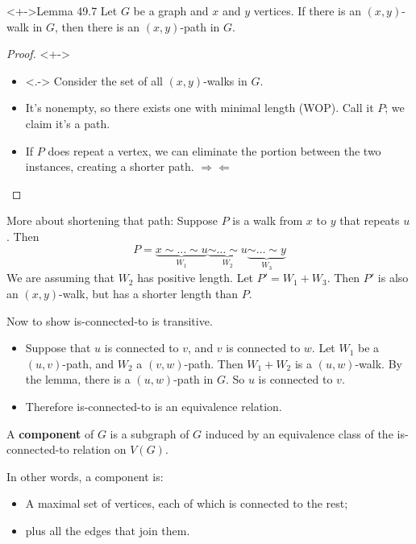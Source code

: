 \documentclass[ignorenonframetext,aspectratio=169]{beamer}
\let\defined\textbf
\newcommand{\raa}{$\Rightarrow\Leftarrow$}
\begin{document}
\begin{frame}[label=lemma]
\begin{block}<+->{Lemma 49.7}
Let $G$ be a graph and $x$ and $y$ vertices.
If there is an $(x,y)$-walk in $G$, then there is an $(x,y)$-path in $G$.
\end{block}
\begin{proof}<+->
\begin{itemize}
\item<.-> Consider the set of all $(x,y)$-walks in $G$.
\item<+-> It's nonempty, so there exists one with minimal length (WOP).  Call it $P$; we claim it's a path.
\item<+-> If $P$ does repeat a vertex, we can eliminate the portion between the two instances, creating a shorter path. \raa \qedhere
\end{itemize}
\end{proof}
\end{frame}

\begin{frame}[label=lemma-2]
More about shortening that path:  Suppose $P$ is a walk from $x$ to $y$ that repeats $u$.  Then
\[
    P = \underbrace{x \sim \dots \sim u}_{W_1}%
    \underbrace{\sim \dots \sim u}_{W_2}%
    \underbrace{\sim \dots \sim y}_{W_3}
\]
We are assuming that $W_2$ has positive length.
Let $P' = W_1 + W_3$.  Then $P'$ is also an $(x,y)$-walk, but has a shorter length than $P$.
\end{frame}

\begin{frame}[label=ctd-thm-proof-2]
Now to show is-connected-to is transitive.
\begin{itemize}
\item Suppose that $u$ is connected to $v$, and $v$ is connected to $w$.
    Let $W_1$ be a $(u,v)$-path, and $W_2$ a $(v,w)$-path.
    Then $W_1+W_2$ is a $(u,w)$-walk.
    By the lemma, there is a $(u,w)$-path in $G$.
    So $u$ is connected to $v$.
\item Therefore is-connected-to is an equivalence relation.
\end{itemize}
\end{frame}

\begin{frame}[label=cpt-def]
\begin{definition}
    A \defined{component} of $G$ is a subgraph of $G$ induced by an equivalence class of
    the is-connected-to relation on $V(G)$.
\end{definition}
In other words, a component is:
\begin{itemize}
\item A maximal set of vertices, each of which is connected to the rest;
\item plus all the edges that join them.
\end{itemize}
\end{frame}
\end{document}
